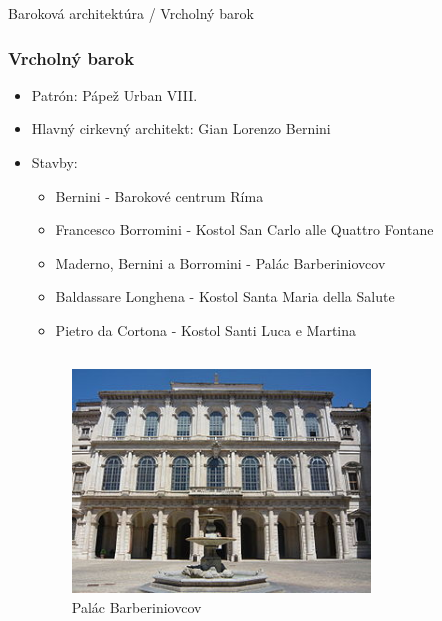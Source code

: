 \documentclass[dvipsnames]{beamer}
\begin{document}
\begin{frame}{\small \textcolor{g}{Baroková architektúra} / \Large Vrcholný barok}
	\subsubsection{Vrcholný barok}
	\begin{itemize}
		\item Patrón: Pápež \textcolor{BurntOrange}{Urban VIII.}
		\item Hlavný cirkevný architekt: \textcolor{BurntOrange}{Gian Lorenzo Bernini}
		\item Stavby:
		      \begin{itemize}
			      \item \textcolor{BurntOrange}{Bernini} - Barokové centrum Ríma
			      \item \textcolor{BurntOrange}{Francesco Borromini} - Kostol San Carlo alle Quattro Fontane
			      \item \textcolor{BurntOrange}{Maderno}, \textcolor{BurntOrange}{Bernini} a \textcolor{BurntOrange}{Borromini} - Palác Barberiniovcov
			      \item \textcolor{BurntOrange}{Baldassare Longhena} - Kostol Santa Maria della Salute
			      \item \textcolor{BurntOrange}{Pietro da Cortona} - Kostol Santi Luca e Martina
		      \end{itemize}
		      \begin{columns}
			      \kern0pt
			      \begin{figure}
				      \includegraphics[scale=0.325]{barberini}
				      \caption{Palác Barberiniovcov}
			      \end{figure}%
			      \begin{figure}

\end{figure}
\end{columns}
\end{itemize}
\end{frame}
\end{document}
